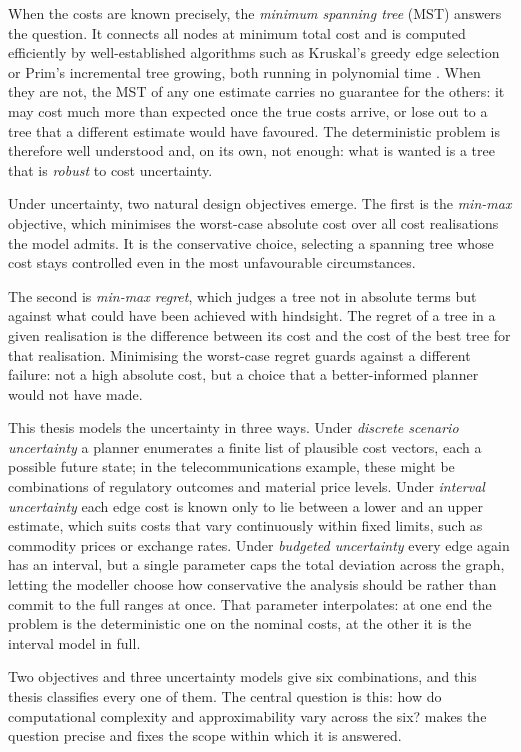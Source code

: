 When the costs are known precisely, the \emph{minimum spanning tree} (MST) answers the question.
It connects all nodes at minimum total cost and is computed efficiently by well-established algorithms such as Kruskal's greedy edge selection or Prim's incremental tree growing, both running in polynomial time \cite[Chapter~6]{KorteVygen2018}.
When they are not, the MST of any one estimate carries no guarantee for the others: it may cost much more than expected once the true costs arrive, or lose out to a tree that a different estimate would have favoured.
The deterministic problem is therefore well understood and, on its own, not enough: what is wanted is a tree that is \emph{robust} to cost uncertainty.

Under uncertainty, two natural design objectives emerge.
The first is the \emph{min-max} objective, which minimises the worst-case absolute cost over all cost realisations the model admits.
It is the conservative choice, selecting a spanning tree whose cost stays controlled even in the most unfavourable circumstances.

The second is \emph{min-max regret}, which judges a tree not in absolute terms but against what could have been achieved with hindsight.
The regret of a tree in a given realisation is the difference between its cost and the cost of the best tree for that realisation.
Minimising the worst-case regret guards against a different failure: not a high absolute cost, but a choice that a better-informed planner would not have made.

This thesis models the uncertainty in three ways.
Under \emph{discrete scenario uncertainty} a planner enumerates a finite list of plausible cost vectors, each a possible future state; in the telecommunications example, these might be combinations of regulatory outcomes and material price levels.
Under \emph{interval uncertainty} each edge cost is known only to lie between a lower and an upper estimate, which suits costs that vary continuously within fixed limits, such as commodity prices or exchange rates.
Under \emph{budgeted uncertainty} every edge again has an interval, but a single parameter caps the total deviation across the graph, letting the modeller choose how conservative the analysis should be rather than commit to the full ranges at once.
That parameter interpolates: at one end the problem is the deterministic one on the nominal costs, at the other it is the interval model in full.

Two objectives and three uncertainty models give six combinations, and this thesis classifies every one of them.
The central question is this: how do computational complexity and approximability vary across the six?
 makes the question precise and fixes the scope within which it is answered.

